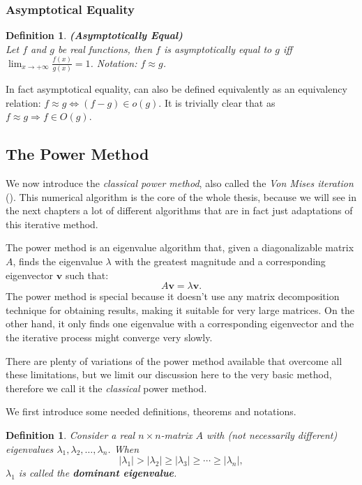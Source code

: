 \documentclass[a4paper,11pt]{report}
\newtheorem{definition}[theorem]{Definition}
\begin{document}
\subsubsection{Asymptotical Equality}
\begin{definition}\label{asympt}\textbf{(Asymptotically Equal)}\\
Let $f$ and $g$ be real functions, then $f$ is asymptotically equal to $g$ iff $\displaystyle\lim_{x\rightarrow +\infty} \frac{f(x)}{g(x)}=1$. Notation: $f \approx g$.
\end{definition}
In fact asymptotical equality, can also be defined equivalently as an equivalency relation: $f\approx g \Leftrightarrow (f-g) \in o(g)$. It is trivially clear that as $f\approx g \Rightarrow f \in O(g)$.

\subsection{The Power Method}\label{powersection}
We now introduce the \textit{classical power method}, also called the \textit{Von Mises iteration} (\cite{golub}). This
numerical algorithm is the core of the whole thesis, because we will see in the next chapters a lot of different
algorithms that are in fact just  adaptations of this iterative method.
 
The power method is an eigenvalue algorithm that, given a diagonalizable matrix $A$, finds the eigenvalue $\lambda$ with the 
greatest magnitude and a corresponding eigenvector $\mathbf{v}$ such that:
$$A\mathbf{v} = \lambda\mathbf{v}.$$
The power method is special because it doesn't use any matrix decomposition 
technique for obtaining results, making it suitable for very large matrices. On
the other hand, it only finds one eigenvalue with a corresponding eigenvector and the 
the iterative process might converge very slowly. 

There are plenty of variations of the 
power method available that overcome all these limitations, but we limit our discussion
here to the very basic method, therefore we call it the \textit{classical} power method.

We first introduce some needed definitions, theorems and notations.
\begin{definition}
  Consider a  real $n\times n$-matrix $A$ with (not necessarily different) 
  eigenvalues $\lambda_1, \lambda_2, \ldots, \lambda_n$. When
  $$|\lambda_1| > |\lambda_2| \geq |\lambda_3| \geq \cdots \geq |\lambda_n|,$$
  $\lambda_1$ is called the \textbf{dominant eigenvalue}.
\end{definition}
\end{document}
